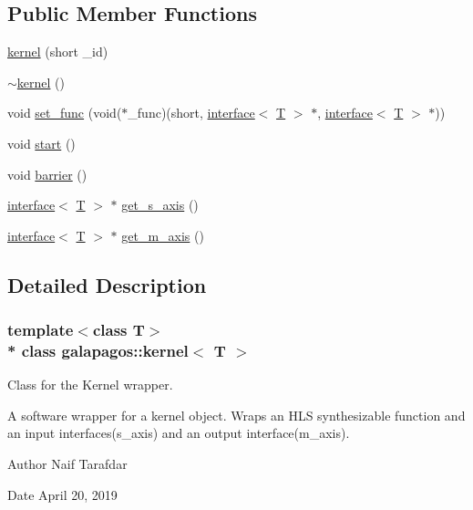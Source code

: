 \subsection*{Public Member Functions}
\begin{DoxyCompactItemize}
\item 
\hyperlink{classgalapagos_1_1kernel_a38480cdc220db5649f10288debbf218e}{kernel} (short \+\_\+id)
\item 
\hyperlink{classgalapagos_1_1kernel_a9c36abc6e2c94a2b54a1c00f613dc4d0}{$\sim$kernel} ()
\item 
void \hyperlink{classgalapagos_1_1kernel_ac547afde42a072f87a4afd40e4c094ac}{set\+\_\+func} (void($\ast$\+\_\+func)(short, \hyperlink{classgalapagos_1_1interface}{interface}$<$ \hyperlink{test_8cpp_a0658ceffa730c765d449bb3d21871b5f}{T} $>$ $\ast$, \hyperlink{classgalapagos_1_1interface}{interface}$<$ \hyperlink{test_8cpp_a0658ceffa730c765d449bb3d21871b5f}{T} $>$ $\ast$))
\item 
void \hyperlink{classgalapagos_1_1kernel_a2899d2f4ecda70caa469d367e4ae703d}{start} ()
\item 
void \hyperlink{classgalapagos_1_1kernel_a816fc814f556ff3e9095ab2942cd760a}{barrier} ()
\item 
\hyperlink{classgalapagos_1_1interface}{interface}$<$ \hyperlink{test_8cpp_a0658ceffa730c765d449bb3d21871b5f}{T} $>$ $\ast$ \hyperlink{classgalapagos_1_1kernel_a72b21cb2c96098b694ddee32dfe1e44b}{get\+\_\+s\+\_\+axis} ()
\item 
\hyperlink{classgalapagos_1_1interface}{interface}$<$ \hyperlink{test_8cpp_a0658ceffa730c765d449bb3d21871b5f}{T} $>$ $\ast$ \hyperlink{classgalapagos_1_1kernel_acc4c06e38ca455be99c1a49ce4dbf8d5}{get\+\_\+m\+\_\+axis} ()
\end{DoxyCompactItemize}


\subsection{Detailed Description}
\subsubsection*{template$<$class T$>$\\*
class galapagos\+::kernel$<$ T $>$}

Class for the Kernel wrapper. 

A software wrapper for a kernel object. Wraps an H\+LS synthesizable function and an input interfaces(s\+\_\+axis) and an output interface(m\+\_\+axis). \begin{DoxyAuthor}{Author}
Naif Tarafdar 
\end{DoxyAuthor}
\begin{DoxyDate}{Date}
April 20, 2019 
\end{DoxyDate}


